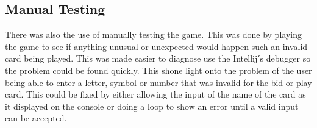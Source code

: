 \subsection{Manual Testing}
There was also the use of manually testing the game. This was done by playing the game to see if anything unusual or unexpected would happen such an invalid card being played. This was made easier to diagnose use the Intellij$'$s debugger so the problem could be found quickly. This shone light onto the problem of the user being able to enter a letter, symbol or number that was invalid for the bid or play card. This could be fixed by either allowing the input of the name of the card as it displayed on the console or doing a loop to show an error until a valid input can be accepted.

